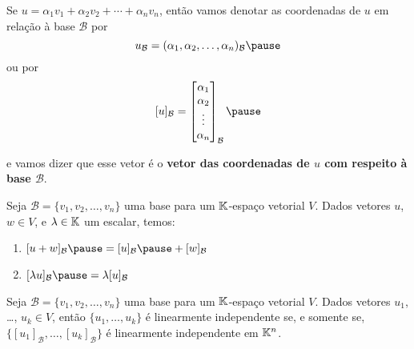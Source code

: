 \documentclass{beamer}
\begin{document}
\begin{frame}
  \begin{notacao}
    Se $u = \alpha_1v_1 + \alpha_2v_2 + \cdots + \alpha_nv_n$, \pause então vamos denotar as coordenadas de $u$ \pause em relação à base $\mathcal{B}$ por\pause
    \[
      u_\mathcal{B} = (\alpha_1, \alpha_2, \dots, \alpha_n)_\mathcal{B}\pause
    \]
    ou por
    \[
      [u]_\mathcal{B} = \begin{bmatrix}\alpha_1\\\alpha_2\\ \vdots\\ \alpha_n\end{bmatrix}_\mathcal{B}\pause
    \]

    e vamos dizer que esse vetor \pause é o \textbf{vetor das coordenadas de $u$ com respeito à base $\mathcal{B}$}.
  \end{notacao}
\end{frame}

\begin{frame}
  \begin{teorema}
    Seja $\mathcal{B} = \{v_1, v_2, \dots, v_n\}$ uma base \pause para um $\mathbb{K}$-espaço vetorial $V$. \pause Dados vetores $u$, $w \in V$, \pause e $\lambda \in \mathbb{K}$ um escalar, temos: \pause
    \begin{enumerate}[label={\roman*})]
      \vspace{.2cm}

      \item $[u + w]_\mathcal{B} \pause = [u]_\mathcal{B} \pause + [w]_\mathcal{B}$ \pause

      \vspace{1cm}

      \item $[\lambda u]_\mathcal{B} \pause = \lambda[u]_\mathcal{B}$
    \end{enumerate}
  \end{teorema}
\end{frame}

\begin{frame}
  \begin{teorema}
    Seja $\mathcal{B} = \{v_1, v_2, \dots, v_n\}$ uma base \pause para um $\mathbb{K}$-espaço vetorial $V$. \pause Dados vetores $u_1$, \dots, $u_k \in V$, \pause então $\{u_1, \dots, u_k\}$ é linearmente independente \pause se, e somente se, \pause $\{[u_1]_\mathcal{B}, \dots, [u_k]_\mathcal{B}\}$ \pause é linearmente independente em $\mathbb{K}^n$.
  \end{teorema}
\end{frame}
\end{document}
